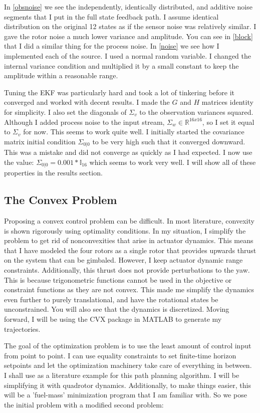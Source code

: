 \documentclass[conf]{new-aiaa}
\begin{document}
\begin{doublespace}
In \ref{obsnoise} we see the independently, identically distributed, and additive noise segments that I put in the full state feedback path. I assume identical distribution on the original 12 states as if the sensor noise was relatively similar. I gave the rotor noise a much lower variance and amplitude. You can see in  \ref{block} that I did a similar thing for the process noise. In \ref{noise} we see how I implemented each of the source. I used a normal random variable. I changed the internal variance condition and multiplied it by a small constant to keep the amplitude within a reasonable range.

Tuning the EKF was particularly hard and took a lot of tinkering before it converged and worked with decent results. I made the $G$ and $H$ matrices identity for simplicity. I also set the diagonals of $\Sigma_v$ to the observation variances squared. Although I added process noise to the input stream, $\Sigma_w \in \mathbb{R}^{16x16}$, so I set it equal to $\Sigma_v$ for now. This seems to work quite well. I initially started the covariance matrix initial condition $\Sigma_{0|0}$ to be very high such that it converged downward. This was a mistake and did not converge as quickly as  I had expected. I now use the value: $\Sigma_{0|0} = 0.001*\mathbb{I}_{16}$ which seems to work very well. I will show all of these properties in the results section.


\subsection{The Convex Problem}
Proposing a convex control problem can be difficult. In most literature, convexity is shown rigorously using optimality conditions. In my situation, I simplify the problem to get rid of nonconvexities that arise in actuator dynamics. This means that I have modeled the four rotors as a single rotor that provides upwards thrust on the system that can be gimbaled. However, I keep actuator dynamic range constraints. Additionally, this thrust does not provide perturbations to the yaw. This is because trigonometric functions cannot be used in the objective or constraint functions as they are not convex. This made me simplify the dynamics even further to purely translational, and have the rotational states be unconstrained. You will also see that the dynamics is discretized. Moving forward, I will be using the CVX package in MATLAB to generate my trajectories.

The goal of the optimization problem is to use the least amount of control input from point to point. I can use equality constraints to set finite-time horizon setpoints and let the optimization machinery take care of everything in between. I shall use \citep{enhancements2008} as a literature example for this path planning algorithm. I will be simplifying it with quadrotor dynamics. Additionally, to make things easier, this will be a 'fuel-mass' minimization program that I am familiar with. So we pose the initial problem with a modified second problem:


\end{doublespace}
\end{document}
